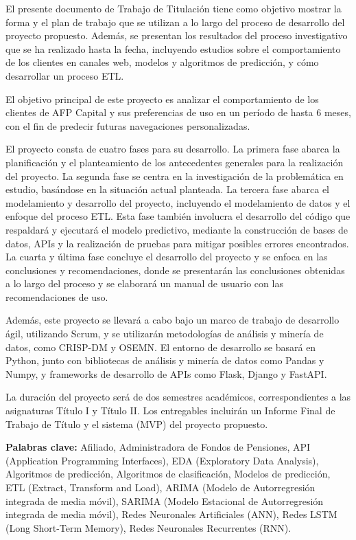 El presente documento de Trabajo de Titulación tiene como objetivo mostrar la forma y el plan de trabajo que se utilizan a lo largo del proceso de desarrollo del proyecto propuesto. Además, se presentan los resultados del proceso investigativo que se ha realizado hasta la fecha, incluyendo estudios sobre el comportamiento de los clientes en canales web, modelos y algoritmos de predicción, y cómo desarrollar un proceso ETL.

El objetivo principal de este proyecto es analizar el comportamiento de los clientes de AFP Capital y sus preferencias de uso en un período de hasta 6 meses, con el fin de predecir futuras navegaciones personalizadas.

El proyecto consta de cuatro fases para su desarrollo. La primera fase abarca la planificación y el planteamiento de los antecedentes generales para la realización del proyecto. La segunda fase se centra en la investigación de la problemática en estudio, basándose en la situación actual planteada. La tercera fase abarca el modelamiento y desarrollo del proyecto, incluyendo el modelamiento de datos y el enfoque del proceso ETL. Esta fase también involucra el desarrollo del código que respaldará y ejecutará el modelo predictivo, mediante la construcción de bases de datos, APIs y la realización de pruebas para mitigar posibles errores encontrados. La cuarta y última fase concluye el desarrollo del proyecto y se enfoca en las conclusiones y recomendaciones, donde se presentarán las conclusiones obtenidas a lo largo del proceso y se elaborará un manual de usuario con las recomendaciones de uso.

Además, este proyecto se llevará a cabo bajo un marco de trabajo de desarrollo ágil, utilizando Scrum, y se utilizarán metodologías de análisis y minería de datos, como CRISP-DM y OSEMN. El entorno de desarrollo se basará en Python, junto con bibliotecas de análisis y minería de datos como Pandas y Numpy, y frameworks de desarrollo de APIs como Flask, Django y FastAPI.

La duración del proyecto será de dos semestres académicos, correspondientes a las asignaturas Título I y Título II. Los entregables incluirán un Informe Final de Trabajo de Título y el sistema (MVP) del proyecto propuesto.

\textbf{Palabras clave:}  Afiliado, Administradora de Fondos de Pensiones, API (Application Programming Interfaces), EDA (Exploratory Data Analysis), Algoritmos de predicción, Algoritmos de clasificación, Modelos de predicción, ETL (Extract, Transform and Load), ARIMA (Modelo de Autorregresión integrada de media móvil), SARIMA (Modelo Estacional de Autorregresión integrada de media móvil), Redes Neuronales Artificiales (ANN), Redes LSTM (Long Short-Term Memory), Redes Neuronales Recurrentes (RNN).
